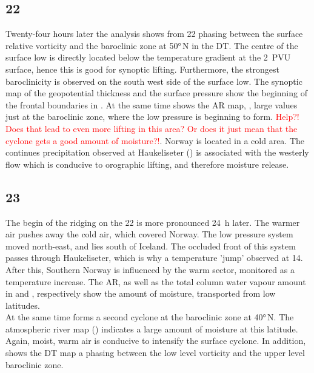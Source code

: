 \subsection*{\SI{22}{\dec}}
\noindent Twenty-four hours later the analysis shows from \SI{22}{\dec} phasing between the surface relative vorticity and the baroclinic zone at \ang{50}{\,N} in the DT. The centre of the surface low is directly located below the temperature gradient at the \SI{2}{PVU} surface, hence this is good for synoptic lifting. Furthermore, the strongest baroclinicity is observed on the south west side of the surface low.
The synoptic map of the geopotential thickness and the surface pressure show the beginning of the frontal boundaries in . 
At the same time shows the AR map, , large values just at the baroclinic zone, where the low pressure is beginning to form. \textcolor{red}{Help?! Does that lead to even more lifting in this area? Or does it just mean that the cyclone gets a good amount of moisture?!}.
Norway is located in a cold area. The continues precipitation observed at Haukeliseter () is associated with the westerly flow which is conducive to orographic lifting, and therefore moisture release.  

\subsection*{\SI{23}{\dec}}
\noindent The begin of the ridging on the \SI{22}{\dec} is more pronounced \SI{24}{\hour} later. The warmer air pushes away the cold air, which covered Norway.
The low pressure system moved north-east, and lies south of Iceland. The occluded front of this system passes through Haukeliseter, which is why a temperature 'jump' observed at \SI{14}{\UTC}. After this, Southern Norway is influenced by the warm sector, monitored as a temperature increase. 
The AR, as well as the total column water vapour amount in  and , respectively show the amount of moisture, transported from low latitudes.
\\
At the same time forms a second cyclone at the baroclinic zone at \ang{40}{\,N}. The atmospheric river map () indicates a large amount of moisture at this latitude. Again, moist, warm air is conducive to intensify the surface cyclone. In addition, shows the DT map a phasing between the low level vorticity and the upper level baroclinic zone. 

